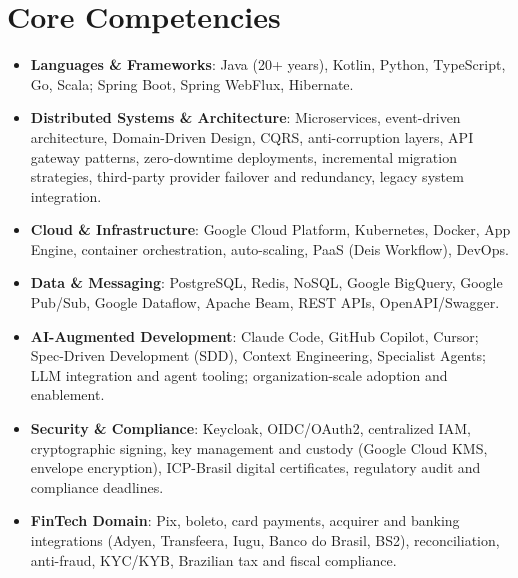 \documentclass[11pt,a4paper,sans]{moderncv}
\begin{document}
\section{Core Competencies}
\vspace{1pt}
\begin{itemize}

\item \textbf{Languages \& Frameworks}: Java (20+ years), Kotlin, Python, TypeScript, Go, Scala; Spring Boot, Spring WebFlux, Hibernate.

\item \textbf{Distributed Systems \& Architecture}: Microservices, event-driven architecture, Domain-Driven Design, CQRS, anti-corruption layers, API gateway patterns, zero-downtime deployments, incremental migration strategies, third-party provider failover and redundancy, legacy system integration.

\item \textbf{Cloud \& Infrastructure}: Google Cloud Platform, Kubernetes, Docker, App Engine, container orchestration, auto-scaling, PaaS (Deis Workflow), DevOps.

\item \textbf{Data \& Messaging}: PostgreSQL, Redis, NoSQL, Google BigQuery, Google Pub/Sub, Google Dataflow, Apache Beam, REST APIs, OpenAPI/Swagger.

\item \textbf{AI-Augmented Development}: Claude Code, GitHub Copilot, Cursor; Spec-Driven Development (SDD), Context Engineering, Specialist Agents; LLM integration and agent tooling; organization-scale adoption and enablement.

\item \textbf{Security \& Compliance}: Keycloak, OIDC/OAuth2, centralized IAM, cryptographic signing, key management and custody (Google Cloud KMS, envelope encryption), ICP-Brasil digital certificates, regulatory audit and compliance deadlines.

\item \textbf{FinTech Domain}: Pix, boleto, card payments, acquirer and banking integrations (Adyen, Transfeera, Iugu, Banco do Brasil, BS2), reconciliation, anti-fraud, KYC/KYB, Brazilian tax and fiscal compliance.

\end{itemize}

\end{document}
